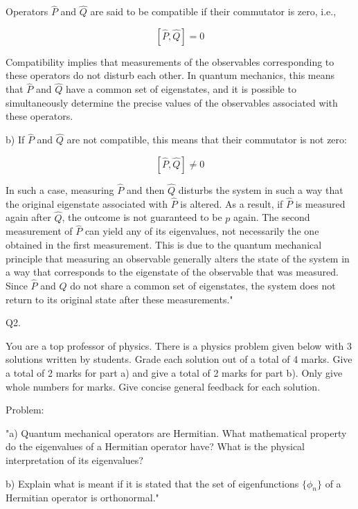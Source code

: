 Operators \( \hat{P} \) and \( \hat{Q} \) are said to be compatible if their commutator is zero, i.e., 

\[ [\hat{P}, \hat{Q}] = 0 \]

Compatibility implies that measurements of the observables corresponding to these operators do not disturb each other. In quantum mechanics, this means that \( \hat{P} \) and \( \hat{Q} \) have a common set of eigenstates, and it is possible to simultaneously determine the precise values of the observables associated with these operators.

b) If \( \hat{P} \) and \( \hat{Q} \) are not compatible, this means that their commutator is not zero:

\[ [\hat{P}, \hat{Q}] \neq 0 \]

In such a case, measuring \( \hat{P} \) and then \( \hat{Q} \) disturbs the system in such a way that the original eigenstate associated with \( \hat{P} \) is altered. As a result, if \( \hat{P} \) is measured again after \( \hat{Q} \), the outcome is not guaranteed to be \( p \) again. The second measurement of \( \hat{P} \) can yield any of its eigenvalues, not necessarily the one obtained in the first measurement. This is due to the quantum mechanical principle that measuring an observable generally alters the state of the system in a way that corresponds to the eigenstate of the observable that was measured. Since \( \hat{P} \) and \( \hat{Q} \) do not share a common set of eigenstates, the system does not return to its original state after these measurements."



                           Q2. 

You are a top professor of physics. There is a physics problem given below with 3 solutions written by students. Grade each solution out of a total of 4 marks. Give a total of 2 marks for part a) and give a total of 2 marks for part b). Only give whole numbers for marks. Give concise general feedback for each solution. 

Problem: 

"a) Quantum mechanical operators are Hermitian. What mathematical property do the eigenvalues of a Hermitian operator have? What is the physical interpretation of its eigenvalues?

b) Explain what is meant if it is stated that the set of eigenfunctions \( \{\phi_{n}\} \) of a Hermitian operator is orthonormal."

